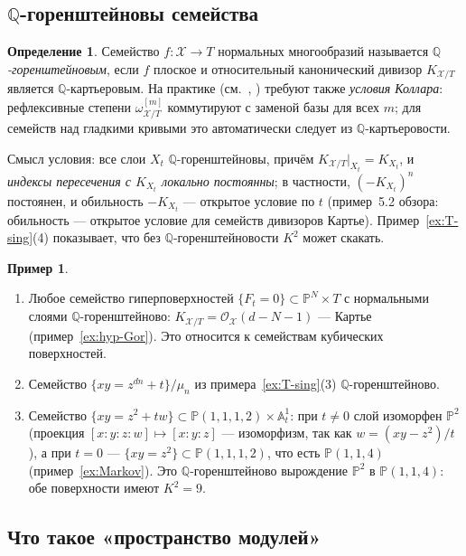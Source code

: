 \documentclass[11pt,a4paper]{article}
\theoremstyle{plain}
\theoremstyle{definition}
\newtheorem{definition}[theorem]{Определение}
\newtheorem{example}[theorem]{Пример}
\theoremstyle{remark}
\newcommand{\Q}{\mathbb{Q}}
\newcommand{\PP}{\mathbb{P}}
\newcommand{\A}{\mathbb{A}}
\newcommand{\cO}{\mathcal{O}}
\newcommand{\cX}{\mathcal{X}}
\begin{document}
\subsection{$\Q$-горенштейновы семейства}

\begin{definition}\label{def:QGor-family}
Семейство $f\colon\cX\to T$ нормальных многообразий называется \emph{$\Q$-горенштейновым}, если
$f$ плоское и относительный канонический дивизор $K_{\cX/T}$ является $\Q$-картьеровым. На практике
(см.~\cite[\S\,2.5]{Xu}, \cite{Kol23}) требуют также \emph{условия Коллара}: рефлексивные степени
$\omega_{\cX/T}^{[m]}$ коммутируют с заменой базы для всех $m$; для семейств над гладкими кривыми
это автоматически следует из $\Q$-картьеровости.
\end{definition}

Смысл условия: все слои $X_t$ $\Q$-горенштейновы, причём $K_{\cX/T}|_{X_t}=K_{X_t}$, и
\emph{индексы пересечения с $K_{X_t}$ локально постоянны}; в частности, $(-K_{X_t})^n$ постоянен,
и обильность $-K_{X_t}$ --- открытое условие по $t$ (пример~5.2 обзора: обильность --- открытое
условие для семейств дивизоров Картье). Пример~\ref{ex:T-sing}(4) показывает, что без
$\Q$-горенштейновости $K^2$ может скакать.

\begin{example}
\begin{enumerate}
\item Любое семейство гиперповерхностей $\{F_t=0\}\subset\PP^N\times T$ с нормальными слоями
$\Q$-горенштейново: $K_{\cX/T}=\cO_\cX(d-N-1)$ --- Картье (пример~\ref{ex:hyp-Gor}).
Это относится к семействам кубических поверхностей.
\item Семейство $\{xy=z^{dn}+t\}/\mu_n$ из примера~\ref{ex:T-sing}(3) $\Q$-горенштейново.
\item Семейство $\{xy=z^2+tw\}\subset\PP(1,1,1,2)\times\A^1_t$: при $t\ne0$ слой изоморфен $\PP^2$
(проекция $[x:y:z:w]\mapsto[x:y:z]$ --- изоморфизм, так как $w=(xy-z^2)/t$), а при $t=0$ ---
$\{xy=z^2\}\subset\PP(1,1,1,2)$, что есть $\PP(1,1,4)$ (пример~\ref{ex:Markov}). Это
$\Q$-горенштейново вырождение $\PP^2$ в $\PP(1,1,4)$: обе поверхности имеют $K^2=9$.
\end{enumerate}
\end{example}

\subsection{Что такое «пространство модулей»}\label{ss:moduli-def}
\end{document}
